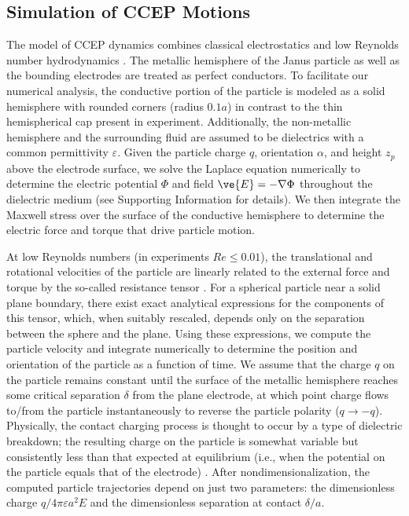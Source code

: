 \subsection{Simulation of CCEP Motions}

The model of CCEP dynamics combines classical electrostatics and low Reynolds number hydrodynamics \cite{drews2015contact}. 
The metallic hemisphere of the Janus particle as well as the bounding electrodes are treated as perfect conductors.
To facilitate our numerical analysis, the conductive portion of the particle is modeled as a solid hemisphere with rounded corners (radius $0.1a$) in contrast to the thin hemispherical cap present in experiment.
Additionally, the non-metallic hemisphere and the surrounding fluid are assumed to be dielectrics with a common permittivity $\varepsilon$.
Given the particle charge $q$, orientation $\alpha$, and height $z_p$ above the electrode surface, we solve the Laplace equation numerically to determine the electric potential $\Phi$ and field $\ve{E}=-\nabla \Phi$ throughout the dielectric medium (see Supporting Information for details).
We then integrate the Maxwell stress over the surface of the conductive hemisphere to determine the electric force and torque that drive particle motion.

At low Reynolds numbers (in experiments $Re\leq0.01$), the translational and rotational velocities of the particle are linearly related to the external force and torque by the so-called resistance tensor \cite{Kim2005, Swan2007}.
For a spherical particle near a solid plane boundary, there exist exact analytical expressions \cite{Kim2005} for the components of this tensor, which, when suitably rescaled, depends only on the separation between the sphere and the plane. 
Using these expressions, we compute the particle velocity and integrate numerically to determine the position and orientation of the particle as a function of time.
We assume that the charge $q$ on the particle remains constant until the surface of the metallic hemisphere reaches some critical separation $\delta$ from the plane electrode, at which point charge flows to/from the particle instantaneously to reverse the particle polarity ($q\rightarrow -q$).
Physically, the contact charging process is thought to occur by a type of dielectric breakdown; the resulting charge on the particle is somewhat variable but consistently less than that expected at equilibrium (i.e., when the potential on the particle equals that of the electrode) \cite{drews2015contact}.
After nondimensionalization, the computed particle trajectories depend on just two parameters: the dimensionless charge $q / 4\pi\varepsilon a^2 E$ and the dimensionless separation at contact $\delta / a$.


